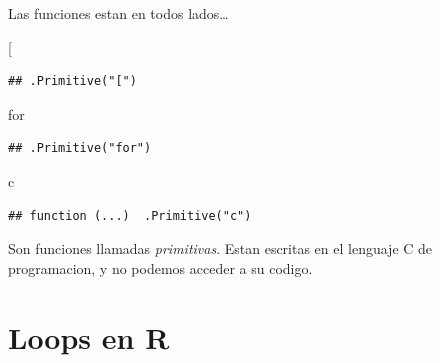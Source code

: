 \documentclass[
  10pt,
  ignorenonframetext,
]{beamer}
\newenvironment{Shaded}{\begin{snugshade}}{\end{snugshade}}
\newcommand{\AttributeTok}[1]{\textcolor[rgb]{0.77,0.63,0.00}{#1}}
\newcommand{\StringTok}[1]{\textcolor[rgb]{0.31,0.60,0.02}{#1}}
\begin{document}
\begin{frame}[fragile]{Las funciones estan en todos lados\ldots{}}
\protect\hypertarget{las-funciones-estan-en-todos-lados-1}{}
\begin{Shaded}
\begin{Highlighting}[]
\StringTok{\textasciigrave{}}\AttributeTok{[}\StringTok{\textasciigrave{}}
\end{Highlighting}
\end{Shaded}

\begin{verbatim}
## .Primitive("[")
\end{verbatim}

\begin{Shaded}
\begin{Highlighting}[]
\StringTok{\textasciigrave{}}\AttributeTok{for}\StringTok{\textasciigrave{}}
\end{Highlighting}
\end{Shaded}

\begin{verbatim}
## .Primitive("for")
\end{verbatim}

\begin{Shaded}
\begin{Highlighting}[]
\StringTok{\textasciigrave{}}\AttributeTok{c}\StringTok{\textasciigrave{}}
\end{Highlighting}
\end{Shaded}

\begin{verbatim}
## function (...)  .Primitive("c")
\end{verbatim}

\vspace{12pt}

Son funciones llamadas \emph{primitivas}. Estan escritas en el lenguaje
C de programacion, y no podemos acceder a su codigo.
\end{frame}

\hypertarget{loops-en-r}{%
\section{Loops en R}\label{loops-en-r}}
\end{document}

